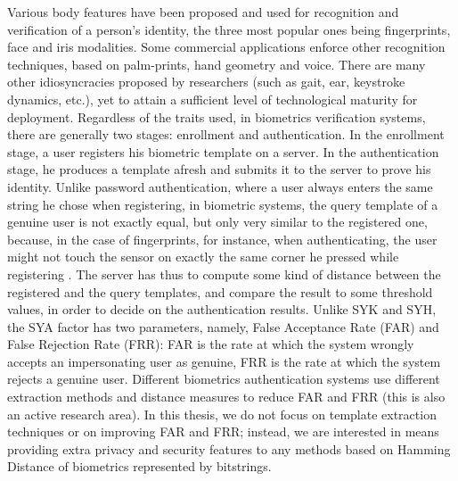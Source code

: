 Various body features have been proposed and used for recognition and
verification of a person's identity, the three most popular ones being fingerprints, face and
iris modalities. Some commercial applications enforce other recognition techniques, based on palm-prints, hand geometry and voice. There are many other idiosyncracies proposed by
researchers (such as gait, ear, keystroke dynamics, etc.), yet to attain a
sufficient level of technological maturity for deployment. Regardless of the
traits used, in biometrics verification systems, there are generally two stages:
enrollment and authentication. In the enrollment stage, a user registers his
biometric template on a server. In the authentication stage, he produces
a template afresh and submits it to the server to prove his identity. Unlike password
authentication, where a user always enters the same string he chose when
registering, in biometric systems, the query template of a genuine user is not exactly equal, but only very similar to the registered one, because, in the case of fingerprints, for instance, when
authenticating, the user might not touch the sensor on exactly the same corner he pressed while registering . The server has thus to compute some kind of distance between the
registered and the query templates, and compare the result to some threshold
values, in order to decide on the authentication results. Unlike SYK and SYH, the SYA
factor has two parameters, namely, False Acceptance Rate (FAR) and False
Rejection Rate (FRR): FAR is the rate at which the system wrongly accepts an
impersonating user as genuine, FRR is the rate at which the system rejects a genuine
user. Different biometrics authentication systems use different extraction
methods and distance measures to reduce FAR and FRR (this is also an active
research area). In this thesis, we do not focus on template extraction techniques
or on improving FAR and FRR; instead, we are interested in means providing extra
privacy and security features to any methods based on Hamming Distance
of biometrics represented by bitstrings.


